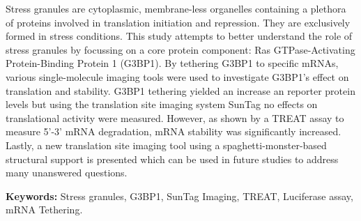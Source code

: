 Stress granules are cytoplasmic, membrane-less organelles containing a plethora of proteins involved in translation initiation and repression.
They are exclusively formed in stress conditions.
This study attempts to better understand the role of stress granules by focussing on a core protein component: Ras GTPase-Activating Protein-Binding Protein 1 (G3BP1).
By tethering G3BP1 to specific mRNAs, various single-molecule imaging tools were used to investigate G3BP1's effect on translation and stability.
G3BP1 tethering yielded an increase an reporter protein levels but using the translation site imaging system SunTag no effects on translational activity were measured.
However, as shown by a TREAT assay to measure 5'-3' mRNA degradation, mRNA stability was significantly increased.
Lastly, a new translation site imaging tool using a spaghetti-monster-based structural support is presented which can be used in future studies to address many unanswered questions.

\noindent
\textbf{Keywords:}
Stress granules, G3BP1, SunTag Imaging, TREAT, Luciferase assay, mRNA Tethering.
